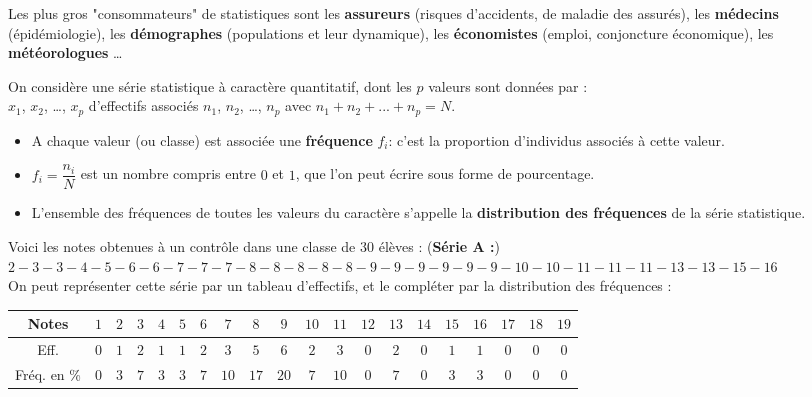 \bigskip
Les plus gros "consommateurs" de statistiques sont les \textbf{assureurs} (risques d'accidents, de maladie des assurés), les \textbf{médecins} (épidémiologie), les \textbf{démographes} (populations et leur dynamique), les \textbf{économistes} (emploi, conjoncture économique), les \textbf{météorologues} \dots

\bigskip

\begin{defi}{}{}
   On considère une série statistique à caractère quantitatif, dont les $p$ valeurs sont données par : \\
   $x_1$, $x_2$, \dots, $x_p$ d'effectifs associés $n_1$, $n_2$, \dots, $n_p$ avec $n_1+n_2+...+n_p=N$.
   \begin{itemize}
      \item  A chaque valeur (ou classe) est associée une \textbf{fréquence} $f_i$: c'est la proportion d'individus associés à cette valeur.
      \item  $f_i=\dfrac{n_i}{N}$ est un nombre compris entre $0$ et $1$, que l'on peut écrire sous forme de pourcentage.
      \item  L'ensemble des fréquences de toutes les valeurs du caractère s'appelle la \textbf{distribution des fréquences} de la série statistique.
   \end{itemize}
\end{defi}
\medskip

\begin{ex}{}{}
   Voici les notes obtenues à un contrôle dans une classe de $30$ élèves : (\textbf{Série A :}) \\ $2-3-3-4-5-6-6-7-7-7-8-8-8-8-8-9-9-9-9-9-9-10-10-11-11-11-13-13-15-16$ \\     
   On peut représenter cette série par un tableau d'effectifs, et le compléter par la distribution des fréquences : \\
   \renewcommand{\arraystretch}{1.5}   
   \begin{tabular}{|c|*{19}{C{0.4}|}}
      \hline       
      Notes & $1$ & $2$ & $3$ & $4$ & $5$ & $6$ & $7$ & $8$ & $9$ & $10$ & $11$ & $12$ & $13$ & $14$ & $15$ & $16$ & $17$ & $18$ & $19$ \\
      \hline
      Eff. & $0$ & $1$ & $2$ & $1$ & $1$ & $2$ & $3$ & $5$ & $6$ & $2$ & $3$ & $0$ & $2$ & $0$ & $1$ & $1$ & $0$ & $0$ & $0$ \\ 
      \hline
      Fréq. en \% & $0$ & $3$ & $7$ & $3$ & $3$ & $7$ & $10$ & $17$ & $20$ & $7$ & $10$ & $0$ & $7$ & $0$ & $3$ & $3$ & $0$ & $0$ & $0$ \\ 
      \hline
   \end{tabular}
\end{ex}
\medskip


